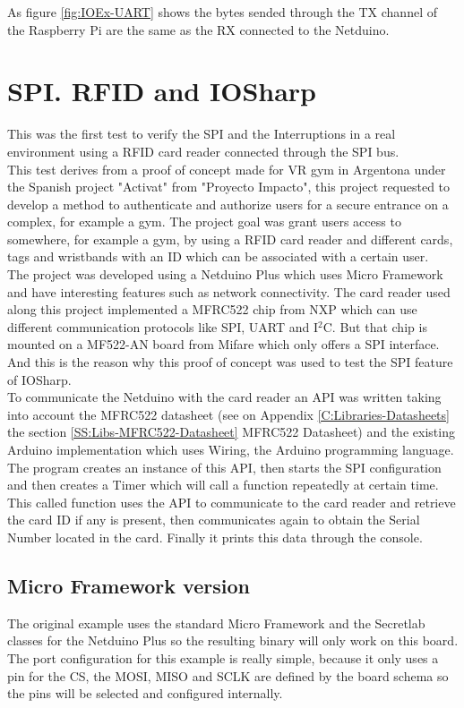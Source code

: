 As figure \ref{fig:IOEx-UART} shows the bytes sended through the \gls{TX} channel of the Raspberry Pi are the same as the \gls{RX} connected to the Netduino.

\section{SPI. RFID and IOSharp}\label{S:rfid-iosharp}
This was the first test to verify the SPI and the Interruptions in a real environment using a RFID card reader connected through the SPI bus.
\\
This test derives from a proof of concept made for VR gym in Argentona under the Spanish project "Activat" from "Proyecto Impacto", this project requested to develop a method to authenticate and authorize users for a secure entrance on a complex, for example a gym. The project goal was grant users access to somewhere, for example a gym, by using a RFID card reader and different cards, tags and wristbands with an ID which can be associated with a certain user.
\\
The project was developed using a Netduino Plus which uses Micro Framework and have interesting features such as network connectivity. The card reader used along this project implemented a MFRC522 chip from NXP which can use different communication protocols like SPI, UART and I$^{2}$C. But that chip is mounted on a MF522-AN board from Mifare which only offers a SPI interface. And this is the reason why this proof of concept was used to test the SPI feature of IOSharp.
\\
To communicate the Netduino with the card reader an API was written taking into account the MFRC522 datasheet (see on Appendix \ref{C:Libraries-Datasheets} the section \ref{SS:Libs-MFRC522-Datasheet} MFRC522 Datasheet) and the existing Arduino implementation which uses Wiring, the Arduino programming language. The program creates an instance of this API, then starts the SPI configuration and then creates a Timer which will call a function repeatedly at certain time. This called function uses the API to communicate to the card reader and retrieve the card ID if any is present, then communicates again to obtain the Serial Number located in the card. Finally it prints this data through the console.


\subsection{Micro Framework version}\label{S:IOEx-SPI-Netduino}
The original example uses the standard Micro Framework and the Secretlab classes for the Netduino Plus so the resulting binary will only work on this board. The port configuration for this example is really simple, because it only uses a pin for the \gls{CS}, the \gls{MOSI}, \gls{MISO} and \gls{SCLK} are defined by the board schema so the pins will be selected and configured internally.

